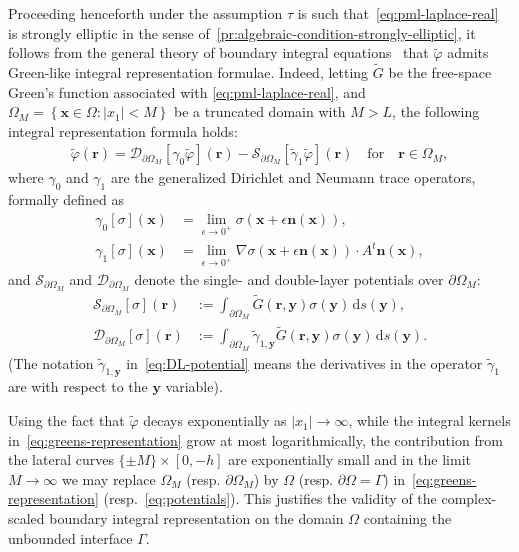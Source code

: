 \documentclass[11pt]{article}
\newcommand{\bn}{\mathbf{n}}
\newcommand{\bx}{\mathbf{x}}
\newcommand{\by}{\mathbf{y}}
\newcommand{\br}{\boldsymbol{r}}
\newcommand{\de}{\,\mathrm{d}}
\newcommand{\tvarphi}{\tilde \varphi}
\begin{document}
Proceeding henceforth under the assumption $\tau$ is such
that~\cref{eq:pml-laplace-real} is strongly elliptic in the sense
of~\cref{pr:algebraic-condition-strongly-elliptic}, it follows from the general
theory of boundary integral equations~\cite{mclean2000strongly} that $\tvarphi$
admits Green-like integral representation formulae. Indeed, letting $\tilde{G}$
be the free-space Green's function associated with \cref{eq:pml-laplace-real},
and $\Omega_M = \left\{\bx \in \Omega : |x_1| <  M \right\}$ be a truncated
domain with $M>L$, the following integral representation formula holds:
\begin{align}
  \label{eq:greens-representation}
  \tvarphi(\br) = \mathcal{D}_{\partial \Omega_M}[\gamma_0\tvarphi](\br) - \mathcal{S}_{\partial \Omega_M}[\tilde{\gamma}_1 {\tvarphi}](\br) \quad \mbox{for} \quad \br \in \Omega_M,
\end{align}
where $\gamma_0$ and $\gamma_1$ are the generalized Dirichlet and Neumann trace
operators, formally defined as 
\begin{subequations}
\label{eq:traces}  
\begin{align}
  \label{eq:dir-trace}
  \gamma_0[\sigma](\bx) &= \lim_{\epsilon \to 0^+} \sigma(\bx + \epsilon \bn(\bx)),\\
  \label{eq:neu-trace}
  \gamma_1[\sigma](\bx) &= \lim_{\epsilon \to 0^+} \nabla \sigma(\bx + \epsilon \bn(\bx)) \cdot A^t \bn(\bx),
\end{align}
\end{subequations}
and $\mathcal{S}_{\partial \Omega_M}$ and $\mathcal{D}_{\partial \Omega_M}$ denote the single- and
double-layer potentials over $\partial \Omega_M$:
\begin{subequations}\label{eq:potentials}
  \begin{align}
    \label{eq:SL-potential}  
    \mathcal{S}_{\partial \Omega_M}[\sigma](\br) &:= \int_{\partial \Omega_M} {\tilde{G}}(\br, \by)\sigma(\by) \de s(\by), \\
    \label{eq:DL-potential}  
    \mathcal{D}_{\partial \Omega_M}[\sigma](\br) &:= \int_{\partial \Omega_M} \tilde{\gamma}_{1,\by}{\tilde{G}}(\br, \by) \sigma(\by) \de s(\by).
  \end{align}
\end{subequations}
(The notation $\tilde{\gamma}_{1,\by}$ in~\eqref{eq:DL-potential} means the
derivatives in the operator $\tilde{\gamma}_1$ are with respect to the $\by$
variable). 

Using the fact that $\tvarphi$ decays exponentially as $|x_1| \to \infty $,
while the integral kernels in~\cref{eq:greens-representation} grow at most
logarithmically, the contribution from the lateral curves $\{ \pm M\} \times
[0,-h]$ are exponentially small and in the limit $M \to \infty$ we may replace
$\Omega_M$ (resp. $\partial \Omega_M$) by $\Omega$ (resp. $\partial \Omega =
\Gamma$) in~\cref{eq:greens-representation} (resp.~\cref{eq:potentials}). This
justifies the validity of the complex-scaled boundary integral representation on
the domain $\Omega$ containing the unbounded interface $\Gamma$. 
\end{document}
